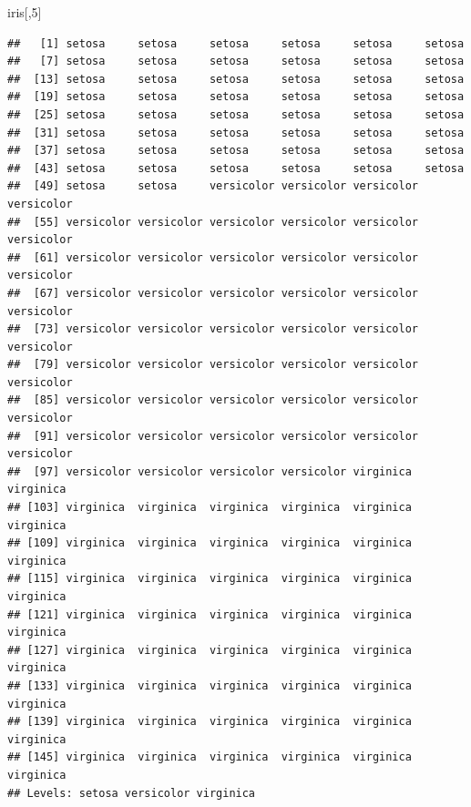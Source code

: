 \documentclass[]{book}
\newenvironment{Shaded}{\begin{snugshade}}{\end{snugshade}}
\newcommand{\DecValTok}[1]{\textcolor[rgb]{0.00,0.00,0.81}{#1}}
\newcommand{\StringTok}[1]{\textcolor[rgb]{0.31,0.60,0.02}{#1}}
\newcommand{\OperatorTok}[1]{\textcolor[rgb]{0.81,0.36,0.00}{\textbf{#1}}}
\newcommand{\NormalTok}[1]{#1}
\theoremstyle{definition}
\theoremstyle{definition}
\theoremstyle{definition}
\theoremstyle{remark}
\begin{document}
\begin{Shaded}
\begin{Highlighting}[]
\NormalTok{iris[,}\DecValTok{5}\NormalTok{]}
\end{Highlighting}
\end{Shaded}

\begin{verbatim}
##   [1] setosa     setosa     setosa     setosa     setosa     setosa    
##   [7] setosa     setosa     setosa     setosa     setosa     setosa    
##  [13] setosa     setosa     setosa     setosa     setosa     setosa    
##  [19] setosa     setosa     setosa     setosa     setosa     setosa    
##  [25] setosa     setosa     setosa     setosa     setosa     setosa    
##  [31] setosa     setosa     setosa     setosa     setosa     setosa    
##  [37] setosa     setosa     setosa     setosa     setosa     setosa    
##  [43] setosa     setosa     setosa     setosa     setosa     setosa    
##  [49] setosa     setosa     versicolor versicolor versicolor versicolor
##  [55] versicolor versicolor versicolor versicolor versicolor versicolor
##  [61] versicolor versicolor versicolor versicolor versicolor versicolor
##  [67] versicolor versicolor versicolor versicolor versicolor versicolor
##  [73] versicolor versicolor versicolor versicolor versicolor versicolor
##  [79] versicolor versicolor versicolor versicolor versicolor versicolor
##  [85] versicolor versicolor versicolor versicolor versicolor versicolor
##  [91] versicolor versicolor versicolor versicolor versicolor versicolor
##  [97] versicolor versicolor versicolor versicolor virginica  virginica 
## [103] virginica  virginica  virginica  virginica  virginica  virginica 
## [109] virginica  virginica  virginica  virginica  virginica  virginica 
## [115] virginica  virginica  virginica  virginica  virginica  virginica 
## [121] virginica  virginica  virginica  virginica  virginica  virginica 
## [127] virginica  virginica  virginica  virginica  virginica  virginica 
## [133] virginica  virginica  virginica  virginica  virginica  virginica 
## [139] virginica  virginica  virginica  virginica  virginica  virginica 
## [145] virginica  virginica  virginica  virginica  virginica  virginica 
## Levels: setosa versicolor virginica
\end{verbatim}

\begin{Shaded}
\end{Shaded}
\end{document}
